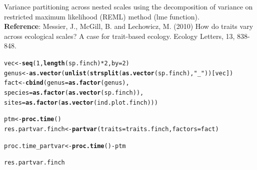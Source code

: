 \documentclass[12pt]{article}\usepackage[]{graphicx}\usepackage[]{color}
\makeatletter
\newcommand{\hlnum}[1]{\textcolor[rgb]{0.686,0.059,0.569}{#1}}%
\newcommand{\hlstr}[1]{\textcolor[rgb]{0.192,0.494,0.8}{#1}}%
\newcommand{\hlopt}[1]{\textcolor[rgb]{0,0,0}{#1}}%
\newcommand{\hlstd}[1]{\textcolor[rgb]{0.345,0.345,0.345}{#1}}%
\newcommand{\hlkwb}[1]{\textcolor[rgb]{0.69,0.353,0.396}{#1}}%
\newcommand{\hlkwc}[1]{\textcolor[rgb]{0.333,0.667,0.333}{#1}}%
\newcommand{\hlkwd}[1]{\textcolor[rgb]{0.737,0.353,0.396}{\textbf{#1}}}%
\newenvironment{kframe}{%
 \def\at@end@of@kframe{}%
 \ifinner\ifhmode%
  \def\at@end@of@kframe{\end{minipage}}%
  \begin{minipage}{\columnwidth}%
 \fi\fi%
 \def\FrameCommand##1{\hskip\@totalleftmargin \hskip-\fboxsep
 \colorbox{shadecolor}{##1}\hskip-\fboxsep
     \hskip-\linewidth \hskip-\@totalleftmargin \hskip\columnwidth}%
 \MakeFramed {\advance\hsize-\width
   \@totalleftmargin\z@ \linewidth\hsize
   \@setminipage}}%
 {\par\unskip\endMakeFramed%
 \at@end@of@kframe}
\newenvironment{knitrout}{}{} %
\makeatother
\begin{document}
Variance partitioning across nested scales using the decomposition of variance on restricted maximum likelihood (REML) method (lme function).
~\\

\textbf{Reference}: Messier, J., McGill, B. and Lechowicz, M. (2010) How do traits vary across ecological scales? A case for trait-based ecology. Ecology Letters, 13, 838-848.

\begin{knitrout}
\color{fgcolor}\begin{kframe}
\begin{alltt}
\hlstd{vec}\hlkwb{<-} \hlkwd{seq}\hlstd{(}\hlnum{1}\hlstd{,}\hlkwd{length}\hlstd{(sp.finch)}\hlopt{*}\hlnum{2}\hlstd{,} \hlkwc{by} \hlstd{=} \hlnum{2}\hlstd{)}
\hlstd{genus}\hlkwb{<-}\hlkwd{as.vector}\hlstd{(}\hlkwd{unlist}\hlstd{(}\hlkwd{strsplit}\hlstd{(}\hlkwd{as.vector}\hlstd{(sp.finch),}\hlstr{"_"}\hlstd{))[vec])}
\hlstd{fact}\hlkwb{<-}\hlkwd{cbind}\hlstd{(}\hlkwc{genus} \hlstd{=} \hlkwd{as.factor}\hlstd{(genus),}
      \hlkwc{species} \hlstd{=} \hlkwd{as.factor}\hlstd{(}\hlkwd{as.vector}\hlstd{(sp.finch)),}
      \hlkwc{sites} \hlstd{=} \hlkwd{as.factor}\hlstd{(}\hlkwd{as.vector}\hlstd{(ind.plot.finch)))}

\hlstd{ptm} \hlkwb{<-} \hlkwd{proc.time}\hlstd{()}
\hlstd{res.partvar.finch}\hlkwb{<-}\hlkwd{partvar}\hlstd{(}\hlkwc{traits} \hlstd{= traits.finch,} \hlkwc{factors} \hlstd{= fact)}
\end{alltt}


{\ttfamily\noindent\itshape\color{messagecolor}{\#\# The partvar function decompose the variance accross nested scales. Thus choose the order of the factors very carefully!}}\begin{alltt}
\hlstd{proc.time_partvar} \hlkwb{<-} \hlkwd{proc.time}\hlstd{()} \hlopt{-} \hlstd{ptm}

\hlstd{res.partvar.finch}
\end{alltt}
\end{kframe}
\end{knitrout}
\end{document}

